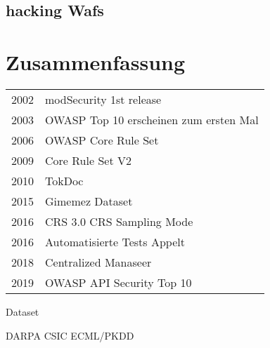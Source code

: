 

\subsection{hacking Wafs}


\section{Zusammenfassung}


\begin{tabular}{ll}
  2002 & modSecurity 1st release \\
  2003 & OWASP Top 10 erscheinen zum ersten Mal\\
  2006 & OWASP Core Rule Set \\
  2009 & Core Rule Set V2 \\
  2010 & TokDoc \\
  2015 & Gimemez Dataset \\
  2016 & CRS 3.0 CRS Sampling Mode \\
  2016 & Automatisierte Tests Appelt \\
  2018 & Centralized Manaseer\\
  2019 & OWASP API Security Top 10\\
\end{tabular}

Dataset

DARPA
CSIC
ECML/PKDD

